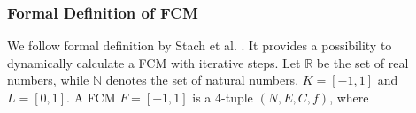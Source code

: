 \documentclass[conference]{IEEEtran}
\begin{document}
\subsubsection{Formal Definition of FCM}
We follow formal definition by Stach et al. \cite{stach2005}. It provides a possibility to dynamically calculate a FCM with iterative steps. Let \begin{math} \mathbb{R} \end{math} be the set of real numbers, while \begin{math} \mathbb{N} \end{math} denotes the set of natural numbers. \begin{math} K = [-1,1] \end{math} and \begin{math} L = [0,1] \end{math}. A FCM \begin{math} F = [-1,1] \end{math} is a 4-tuple \begin{math} (N,E,C,f) \end{math}, where
\end{document}
